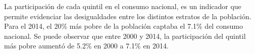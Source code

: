 La participación de cada quintil en el consumo nacional, es un indicador que permite evidenciar las  desigualdades entre los distintos estratos de la población. Para el 2014, el 20\% más  pobre de la población captaba el 7.1\% del consumo nacional. Se puede observar que entre 2000 y 2014, la participación del quintil más pobre aumentó de 5.2\% en 2000 a 7.1\%  en 2014.
